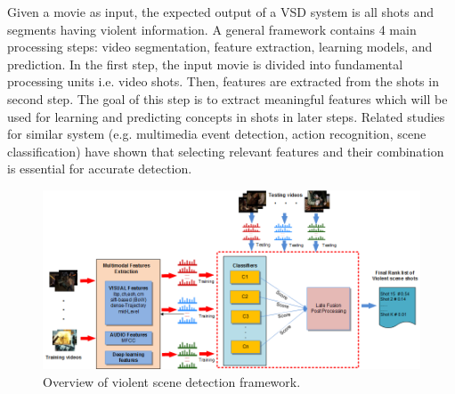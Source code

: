 \documentclass[review]{elsarticle}
\begin{document}
Given a movie as input, the expected output of a VSD system is all shots and segments having violent information. A general framework contains 4 main processing steps: video segmentation, feature extraction, learning models, and prediction. In the first step, the input movie is divided into fundamental processing units i.e. video shots. Then, features are extracted from the shots in second step. The goal of this step is to extract meaningful features which will be used for learning and predicting concepts in shots in later steps. Related studies for similar system (e.g. multimedia event detection, action recognition, scene classification) have shown that selecting relevant features and their combination is essential for accurate detection.
\begin{figure}[!t]
	\centering
	\includegraphics[width=1\linewidth]{Images/Framework1.png}
	\caption{Overview of violent scene detection framework.}
	\label{fig:framework}
\end{figure}

\end{document}
